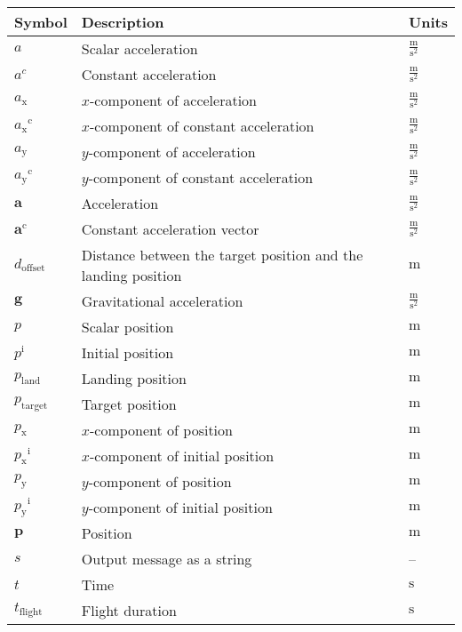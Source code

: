 \documentclass[12pt]{article}
\begin{document}
\begin{longtabu}{l X[l] l}
\toprule
\textbf{Symbol} & \textbf{Description} & \textbf{Units}
\\
\midrule
\endhead
$a$ & Scalar acceleration & $\frac{\text{m}}{\text{s}^{2}}$
\\
${a^{c}}$ & Constant acceleration & $\frac{\text{m}}{\text{s}^{2}}$
\\
${a_{\text{x}}}$ & $x$-component of acceleration & $\frac{\text{m}}{\text{s}^{2}}$
\\
${{a_{\text{x}}}^{\text{c}}}$ & $x$-component of constant acceleration & $\frac{\text{m}}{\text{s}^{2}}$
\\
${a_{\text{y}}}$ & $y$-component of acceleration & $\frac{\text{m}}{\text{s}^{2}}$
\\
${{a_{\text{y}}}^{\text{c}}}$ & $y$-component of constant acceleration & $\frac{\text{m}}{\text{s}^{2}}$
\\
$\mathbf{a}$ & Acceleration & $\frac{\text{m}}{\text{s}^{2}}$
\\
${\mathbf{a}^{\text{c}}}$ & Constant acceleration vector & $\frac{\text{m}}{\text{s}^{2}}$
\\
${d_{\text{offset}}}$ & Distance between the target position and the landing position & ${\text{m}}$
\\
$\mathbf{g}$ & Gravitational acceleration & $\frac{\text{m}}{\text{s}^{2}}$
\\
$p$ & Scalar position & ${\text{m}}$
\\
${p^{\text{i}}}$ & Initial position & ${\text{m}}$
\\
${p_{\text{land}}}$ & Landing position & ${\text{m}}$
\\
${p_{\text{target}}}$ & Target position & ${\text{m}}$
\\
${p_{\text{x}}}$ & $x$-component of position & ${\text{m}}$
\\
${{p_{\text{x}}}^{\text{i}}}$ & $x$-component of initial position & ${\text{m}}$
\\
${p_{\text{y}}}$ & $y$-component of position & ${\text{m}}$
\\
${{p_{\text{y}}}^{\text{i}}}$ & $y$-component of initial position & ${\text{m}}$
\\
$\mathbf{p}$ & Position & ${\text{m}}$
\\
$s$ & Output message as a string & --
\\
$t$ & Time & ${\text{s}}$
\\
${t_{\text{flight}}}$ & Flight duration & ${\text{s}}$
\\

\end{longtabu}
\end{document}
